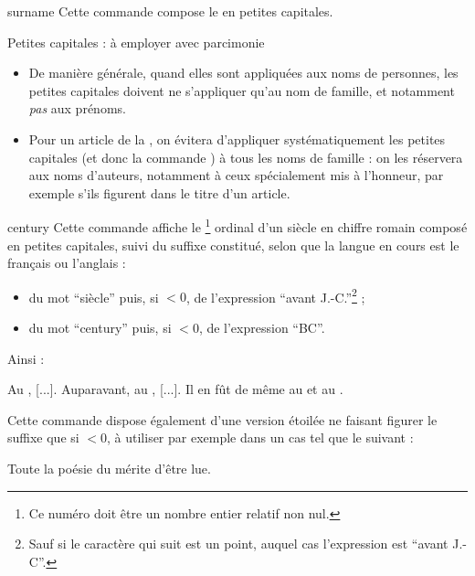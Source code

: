 \begin{docCommand}{surname}{}
  Cette commande compose le  en petites capitales.
  \begin{dbwarning}{Petites capitales : à employer avec parcimonie}{}
    \begin{itemize}
    \item De manière générale, quand elles sont appliquées aux noms de
      personnes, les petites capitales doivent ne s'appliquer qu'au nom de
      famille, et notamment \emph{pas} aux prénoms.
    \item Pour un article de la \gzt{}, on évitera d'appliquer systématiquement
      les petites capitales (et donc la commande ) à tous les
      noms de famille : on les réservera aux noms d'auteurs, notamment à ceux
      spécialement mis à l'honneur, par exemple s'ils figurent dans le titre
      d'un article.
    \end{itemize}
  \end{dbwarning}
\end{docCommand}

\begin{docCommand}{century}{}
  Cette commande affiche le \footnote{Ce numéro doit être un nombre
    entier relatif non nul.} ordinal d'un siècle en chiffre romain composé en
  petites capitales, suivi du suffixe constitué, selon que la langue en cours
  est le français ou l'anglais :
  \begin{itemize}
  \item du mot \enquote{siècle} puis, si  $<0$, de l'expression
    \enquote{avant J.-C.}\footnote{Sauf si le caractère qui suit est un point,
      auquel cas l'expression est \enquote{avant J.-C}.} ;
  \item du mot \enquote{century} puis, si  $<0$, de l'expression
    \enquote{BC}.
  \end{itemize}
  Ainsi :
\begin{bodycode}
Au , [...]. Auparavant, au , [...]. Il en fût de même au
 et au .
\end{bodycode}
  Cette commande dispose également d'une version étoilée ne faisant figurer
  le suffixe que si  $<0$, à utiliser par exemple dans un cas tel
  que le suivant :
\begin{bodycode}
Toute la poésie du  mérite d'être lue.
\end{bodycode}
\end{docCommand}

